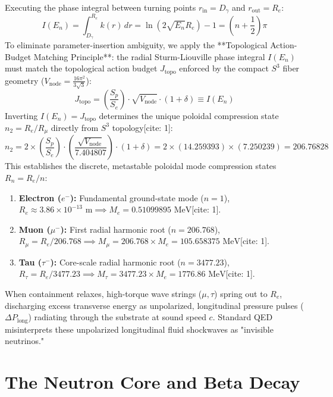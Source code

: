 \documentclass[11pt,a4paper]{article}
\begin{document}
	Executing the phase integral between turning points $r_{\text{in}} = D_\gamma$ and $r_{\text{out}} = R_e$:
	\begin{equation}
		I(E_n) = \int_{D_\gamma}^{R_e} k(r) \, dr = \ln\left(2 \sqrt{E_n} R_e\right) - 1 = \left(n + \frac{1}{2}\right) \pi
	\end{equation}
	To eliminate parameter-insertion ambiguity, we apply the **Topological Action-Budget Matching Principle**: the radial Sturm-Liouville phase integral $I(E_n)$ must match the topological action budget $J_{\text{topo}}$ enforced by the compact $S^3$ fiber geometry ($V_{\text{node}} = \frac{16\pi^2}{3\sqrt{3}}$):
	\begin{equation}
		J_{\text{topo}} = \left(\frac{S_p}{S_e}\right) \cdot \sqrt{V_{\text{node}}} \cdot (1 + \delta) \equiv I(E_n)
	\end{equation}
	Inverting $I(E_n) = J_{\text{topo}}$ determines the unique poloidal compression state $n_2 = R_e / R_\mu$ directly from $S^3$ topology[cite: 1]:
	\begin{equation}
		n_2 = 2 \times \left(\frac{S_p}{S_e}\right) \cdot \left(\frac{\sqrt{V_{\text{node}}}}{7.404807}\right) \cdot (1 + \delta) = 2 \times (14.259393) \times (7.250239) = 206.76828
	\end{equation}
	This establishes the discrete, metastable poloidal mode compression states $R_n = R_e / n$:
	\begin{enumerate}
		\item \textbf{Electron ($e^-$):} Fundamental ground-state mode ($n=1$), $R_e \approx 3.86 \times 10^{-13}\text{ m} \implies M_e = 0.51099895\text{ MeV}$[cite: 1].
		\item \textbf{Muon ($\mu^-$):} First radial harmonic root ($n=206.768$), $R_\mu = R_e / 206.768 \implies M_\mu = 206.768 \times M_e = 105.658375\text{ MeV}$[cite: 1].
		\item \textbf{Tau ($\tau^-$):} Core-scale radial harmonic root ($n=3477.23$), $R_\tau = R_e / 3477.23 \implies M_\tau = 3477.23 \times M_e = 1776.86\text{ MeV}$[cite: 1].
	\end{enumerate}
	When containment relaxes, high-torque wave strings ($\mu, \tau$) spring out to $R_e$, discharging excess transverse energy as unpolarized, longitudinal pressure pulses ($\Delta P_{\text{long}}$) radiating through the substrate at sound speed $c$. Standard QED misinterprets these unpolarized longitudinal fluid shockwaves as "invisible neutrinos."
	
	\section{The Neutron Core and Beta Decay}
	
\end{document}
